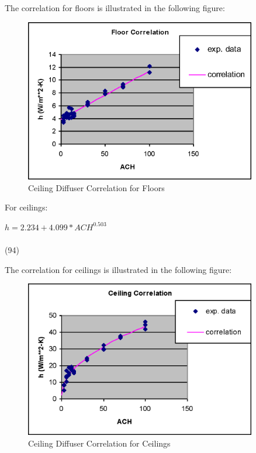 The correlation for floors is illustrated in the following figure:

\begin{figure}[hbtp] %
\centering
\includegraphics[width=0.9\textwidth, height=0.9\textheight, keepaspectratio=true]{media/image378.png}
\caption{Ceiling Diffuser Correlation for Floors \protect \label{fig:ceiling-diffuser-correlation-for-floors}}
\end{figure}

For ceilings:

\(h = 2.234 + 4.099 * AC{H^{0.503}}\) ~~~~~~~~~~~~~~~~~~~~~~~~~~~~~~~~~~~~~~~~~~~~~~~~~~~~~~~~~~~~~~~~~~~~ (94)

The correlation for ceilings is illustrated in the following figure:

\begin{figure}[hbtp] %
\centering
\includegraphics[width=0.9\textwidth, height=0.9\textheight, keepaspectratio=true]{media/image380.png}
\caption{Ceiling Diffuser Correlation for Ceilings \protect \label{fig:ceiling-diffuser-correlation-for-ceilings}}
\end{figure}


